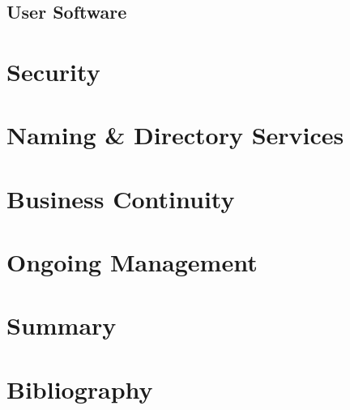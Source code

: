 \documentclass[a4paper, twoside]{article}
\begin{document}
\subsection{User Software}

\section{Security}

\section{Naming \& Directory Services}

\section{Business Continuity}

\section{Ongoing Management}

\section{Summary}

\section{Bibliography}
\end{document}
